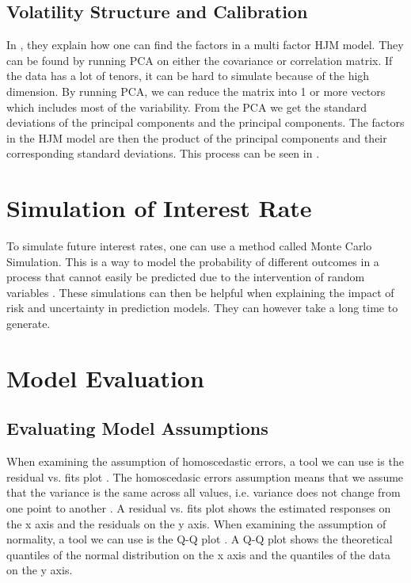 \newpage

\subsection{Volatility Structure and Calibration}

\noindent In \cite[p.~180--184]{monte_carlo_method_financial_engineering}, they explain how one can find the factors in a multi factor HJM model. They can be found by running PCA on either the covariance or correlation matrix. If the data has a lot of tenors, it can be hard to simulate because of the high dimension. By running PCA, we can reduce the matrix into 1 or more vectors which includes most of the variability. From the PCA we get the standard deviations of the principal components and the principal components. The factors in the HJM model are then the product of the principal components and their corresponding standard deviations. This process can be seen in \cite[p.~617--619]{WFI}.



\section{Simulation of Interest Rate}

\noindent To simulate future interest rates, one can use a method called Monte Carlo Simulation. This is a way to model the probability of different outcomes in a process that cannot easily be predicted due to the intervention of random variables \cite{investopedia_monte_carlo_simulation}. These simulations can then be helpful when explaining the impact of risk and uncertainty in prediction models. They can however take a long time to generate.

\section{Model Evaluation}

\subsection{Evaluating Model Assumptions}

\noindent When examining the assumption of homoscedastic errors, a tool we can use is the residual vs. fits plot \cite[p.~155]{regression}. The homoscedasic errors assumption means that we assume that the variance is the same across all values, i.e. variance does not change from one point to another \cite[p.~87]{regression}. A residual vs. fits plot shows the estimated responses on the x axis and the residuals on the y axis. When examining the assumption of normality, a tool we can use is the Q-Q plot \cite[p.~156]{regression}. A Q-Q plot shows the theoretical quantiles of the normal distribution on the x axis and the quantiles of the data on the y axis.

